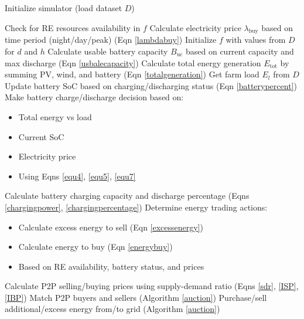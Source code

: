 \documentclass[preprint,12pt]{elsarticle}
\begin{document}
\begin{algorithm}
\caption{Rule-based MAPDES Model Pseudocode from \cite{shah2024peer}}
\label{RBpseudocode}
\begin{algorithmic}[1]
    \State Initialize simulator (load dataset $D$)
    
                \State Check for RE resources availability in $f$
                \State Calculate electricity price $\lambda_{\text{buy}}$ based on time period (night/day/peak) (Eqn \ref{lambdabuy})
                \State Initialize $f$ with values from $D$ for $d$ and $h$
                \State Calculate usable battery capacity $B_{\text{uc}}$ based on current capacity and max discharge (Eqn \ref{usbalecapacity})
                \State Calculate total energy generation $E_{\text{tot}}$ by summing PV, wind, and battery (Eqn \ref{totalgeneration})
                \State Get farm load $E_l$ from $D$
                \State Update battery SoC based on charging/discharging status (Eqn \ref{batterypercent})
                \State Make battery charge/discharge decision based on:
                      \begin{itemize}
                        \item Total energy vs load
                        \item Current SoC
                        \item Electricity price
                        \item Using Eqns \ref{equ4}, \ref{equ5}, \ref{equ7}
                      \end{itemize}
                \State Calculate battery charging capacity and discharge percentage (Eqns \ref{chargingpower}, \ref{chargingpercentage})
                \State Determine energy trading actions:
                      \begin{itemize}
                        \item Calculate excess energy to sell (Eqn \ref{excessenergy})
                        \item Calculate energy to buy (Eqn \ref{energybuy})
                        \item Based on RE availability, battery status, and prices
                      \end{itemize}
            \EndFor
            \State Calculate P2P selling/buying prices using supply-demand ratio (Eqns \ref{sdr}, \ref{ISP}, \ref{IBP})
            \State Match P2P buyers and sellers (Algorithm \ref{auction})
            \State Purchase/sell additional/excess energy from/to grid (Algorithm \ref{auction})
        \EndFor
    \EndFor
\end{algorithmic}
\end{algorithm}
\end{document}

